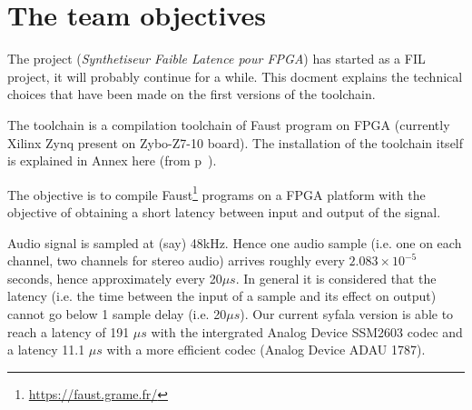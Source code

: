 \section{The \syfala team objectives}
The \syfala project ({\em Synthetiseur Faible Latence pour FPGA}) has started as a FIL project, it will probably continue for a while. This docment explains the technical choices that have been made on the first versions of the \syfala toolchain.

The \syfala toolchain is a compilation toolchain of Faust program on FPGA (currently Xilinx Zynq present on Zybo-Z7-10 board). The installation of the toolchain itself is explained  in Annex here (from p~\pageref{Annex1}).

The objective is to compile Faust\footnote{\url{https://faust.grame.fr/}} programs on a FPGA platform with the objective of obtaining a short latency between input and output of the signal.

Audio signal is sampled at (say) 48kHz. Hence one audio sample (i.e. one on each channel, two channels for stereo audio) arrives roughly every $2.083 \times 10^{-5}$ seconds, hence approximately every 20$\mu s$. In general it is considered that the latency (i.e. the time between the input of a sample and its effect on output) cannot go below 1 sample delay (i.e. 20$\mu s$). Our current syfala version is able to reach a latency of 191 $\mu s$ with the intergrated Analog Device SSM2603 codec and a latency 11.1 $\mu s$ with a more efficient codec (Analog Device ADAU 1787).



